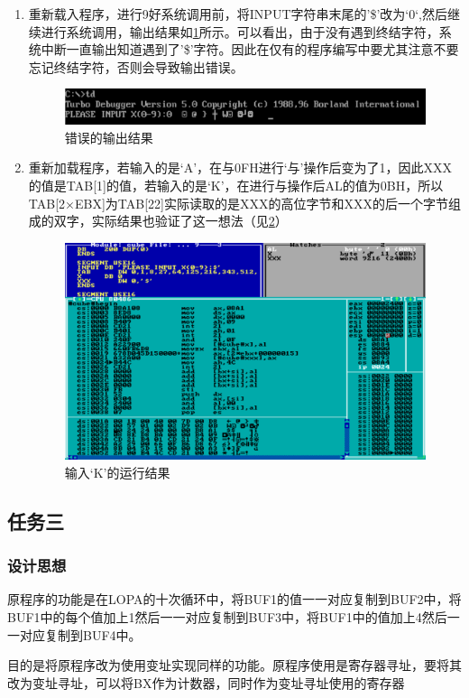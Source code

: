 \documentclass{article}
\begin{document}
\begin{enumerate}
		\item 重新载入程序，进行9好系统调用前，将INPUT字符串末尾的’\$’改为‘0‘,然后继续进行系统调用，输出结果如\ref{fig:errorout}所示。可以看出，由于没有遇到终结字符，系统中断一直输出知道遇到了’\$’字符。因此在仅有的程序编写中要尤其注意不要忘记终结字符，否则会导致输出错误。
			\begin{figure}[H]
				\centering
				\includegraphics[width=0.8\linewidth]{res/homework_1/fig9.png}
				\caption{错误的输出结果}
				\label{fig:errorout}
			\end{figure}

		\item 重新加载程序，若输入的是‘A’，在与0FH进行‘与’操作后变为了1，因此XXX的值是TAB[1]的值，若输入的是‘K’，在进行与操作后AL的值为0BH，所以TAB[2×EBX]为TAB[22]实际读取的是XXX的高位字节和XXX的后一个字节组成的双字，实际结果也验证了这一想法（见\ref{fig:inputk}）
			\begin{figure}[H]
				\centering
				\includegraphics[width=0.8\linewidth]{res/homework_1/fig10.png}
				\caption{输入‘K’的运行结果}
				\label{fig:inputk}
			\end{figure}
	\end{enumerate}

	\subsection{任务三}
	\subsubsection{设计思想}
	原程序的功能是在LOPA的十次循环中，将BUF1的值一一对应复制到BUF2中，将BUF1中的每个值加上1然后一一对应复制到BUF3中，将BUF1中的值加上4然后一一对应复制到BUF4中。\par
	目的是将原程序改为使用变址实现同样的功能。原程序使用是寄存器寻址，要将其改为变址寻址，可以将BX作为计数器，同时作为变址寻址使用的寄存器
\end{document}
